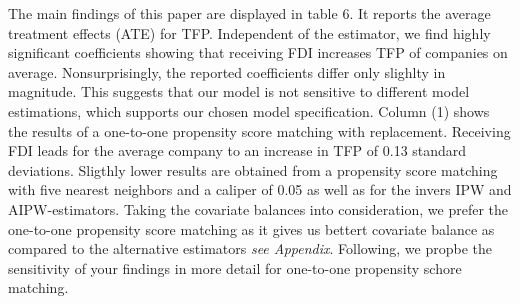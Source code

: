 \documentclass[a4paper,11pt]{scrartcl}
\begin{document}
The main findings of this paper are displayed in table 6. It reports the average treatment effects (ATE) for TFP.  Independent of the estimator, we find highly significant coefficients showing that receiving FDI increases TFP of companies on average. Nonsurprisingly, the reported coefficients differ only slighlty in magnitude. This suggests that our model is not sensitive to different model estimations, which supports our chosen model specification.  Column (1) shows the results of a one-to-one propensity score matching with replacement. Receiving FDI leads for the average company to an increase in TFP of 0.13 standard deviations. Sligthly lower results are obtained from a propensity score matching with five nearest neighbors and a caliper of 0.05 as well as for the invers IPW and AIPW-estimators.
Taking the covariate balances into consideration, we prefer the one-to-one propensity score matching as it gives us bettert covariate balance as compared to the alternative estimators \textit{see Appendix}. Following, we propbe the sensitivity of your findings in  more detail for one-to-one propensity schore matching. 

\end{document}
